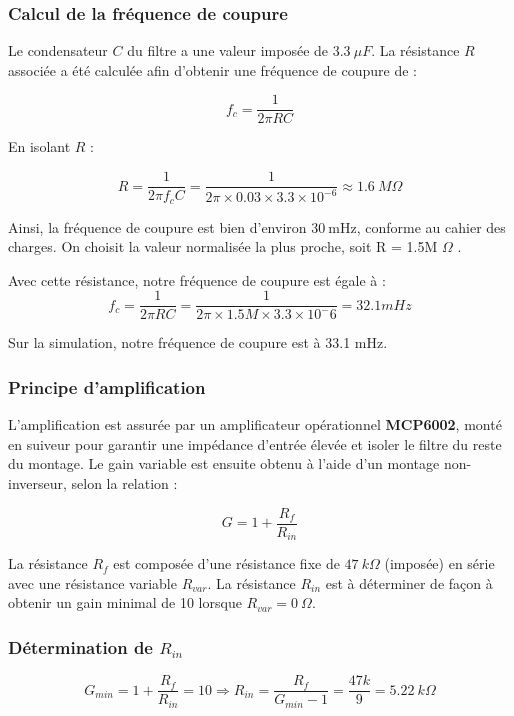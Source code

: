 \documentclass{article}
\begin{document}
\subsubsection{Calcul de la fréquence de coupure}

Le condensateur \( C \) du filtre a une valeur imposée de \( 3.3~\mu F \).  
La résistance \( R \) associée a été calculée afin d’obtenir une fréquence de coupure de :

\[
f_c = \frac{1}{2\pi R C}
\]

En isolant \( R \) :

\[
R = \frac{1}{2\pi f_c C} = \frac{1}{2\pi \times 0.03 \times 3.3 \times 10^{-6}} \approx 1.6~M\Omega
\]

Ainsi, la fréquence de coupure est bien d’environ \( 30~\text{mHz} \), conforme au cahier des charges.
On choisit la valeur normalisée la plus proche, soit R = 1.5M $\Omega$ .

Avec cette résistance, notre fréquence de coupure est égale à :
\begin{equation}
    f_c = \frac{1}{2 \pi RC} = \frac{1}{2 \pi \times 1.5M \times 3.3 \times 10^-6} = 32.1 mHz
\end{equation}

Sur la simulation, notre fréquence de coupure est à 33.1 mHz.

\subsubsection{Principe d’amplification}

L’amplification est assurée par un amplificateur opérationnel \textbf{MCP6002}, monté en suiveur pour garantir une impédance d’entrée élevée et isoler le filtre du reste du montage.  
Le gain variable est ensuite obtenu à l’aide d’un montage non-inverseur, selon la relation :

\[
G = 1 + \frac{R_f}{R_{in}}
\]

La résistance \(R_f\) est composée d’une résistance fixe de \(47~k\Omega\) (imposée) en série avec une résistance variable \(R_{var}\).  
La résistance \(R_{in}\) est à déterminer de façon à obtenir un gain minimal de 10 lorsque \(R_{var} = 0~\Omega\).

\subsubsection{Détermination de \(R_{in}\)}

\[
G_{min} = 1 + \frac{R_f}{R_{in}} = 10
\Rightarrow R_{in} = \frac{R_f}{G_{min}-1} = \frac{47k}{9} = 5.22~k\Omega
\]
\end{document}

